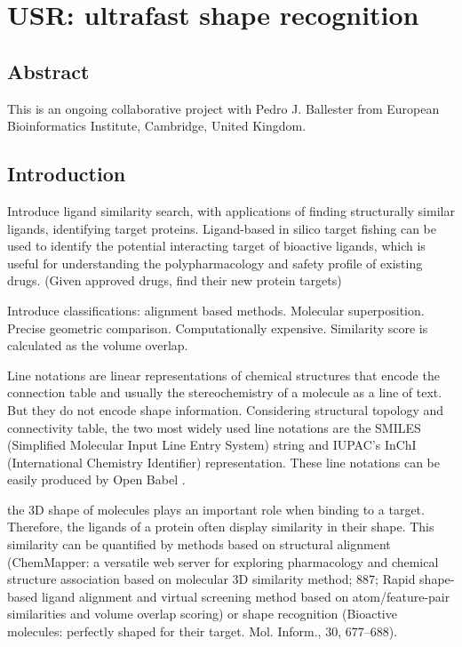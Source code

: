 \chapter{USR: ultrafast shape recognition}

\section{Abstract}

This is an ongoing collaborative project with Pedro J. Ballester from European Bioinformatics Institute, Cambridge, United Kingdom.

\section{Introduction}

Introduce ligand similarity search, with applications of finding structurally similar ligands, identifying target proteins. \citep{1402} Ligand-based in silico target fishing can be used to identify the potential interacting target of bioactive ligands, which is useful for understanding the polypharmacology and safety profile of existing drugs. (Given approved drugs, find their new protein targets)

Introduce classifications: alignment based methods. Molecular superposition. Precise geometric comparison. Computationally expensive. Similarity score is calculated as the volume overlap.

Line notations are linear representations of chemical structures that encode the connection table and usually the stereochemistry of a molecule as a line of text. But they do not encode shape information. Considering structural topology and connectivity table, the two most widely used line notations are the SMILES (Simplified Molecular Input Line Entry System) string \citep{} and IUPAC’s InChI (International Chemistry Identifier) representation. These line notations can be easily produced by Open Babel \citep{968}.

\citep{1407} the 3D shape of molecules plays an important role when binding to a target. Therefore, the ligands of a protein often display similarity in their shape. This similarity can be quantified by methods based on structural alignment (ChemMapper: a versatile web server for exploring pharmacology and chemical structure association based on molecular 3D similarity method; 887; Rapid shape-based ligand alignment and virtual screening method based on atom/feature-pair similarities and volume overlap scoring) or shape recognition \citep{1379,1332} (Bioactive molecules: perfectly shaped for their target. Mol. Inform., 30, 677–688).

